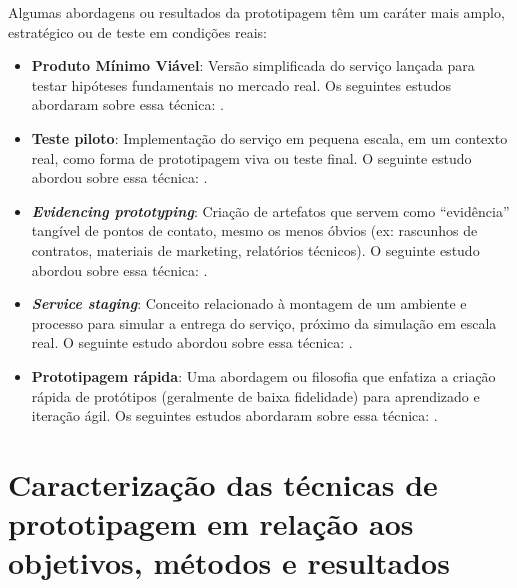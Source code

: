 Algumas abordagens ou resultados da prototipagem têm um caráter mais amplo, estratégico ou de teste em condições reais:

\begin{itemize}
	\item \textbf{Produto Mínimo Viável}: Versão simplificada do serviço lançada para testar hipóteses fundamentais no mercado real. Os seguintes estudos abordaram sobre essa técnica: .
	
	\item \textbf{Teste piloto}: Implementação do serviço em pequena escala, em um contexto real, como forma de prototipagem viva ou teste final. O seguinte estudo abordou sobre essa técnica: .
	
	\item \textbf{\textit{Evidencing prototyping}}: Criação de artefatos que servem como ``evidência'' tangível de pontos de contato, mesmo os menos óbvios (ex: rascunhos de contratos, materiais de marketing, relatórios técnicos). O seguinte estudo abordou sobre essa técnica: .
	
	\item \textbf{\textit{Service staging}}: Conceito relacionado à montagem de um ambiente e processo para simular a entrega do serviço, próximo da simulação em escala real. O seguinte estudo abordou sobre essa técnica: .
	
	\item \textbf{Prototipagem rápida}: Uma abordagem ou filosofia que enfatiza a criação rápida de protótipos (geralmente de baixa fidelidade) para aprendizado e iteração ágil. Os seguintes estudos abordaram sobre essa técnica: .
\end{itemize}



\section{Caracterização das técnicas de prototipagem em relação aos objetivos, métodos e resultados}

